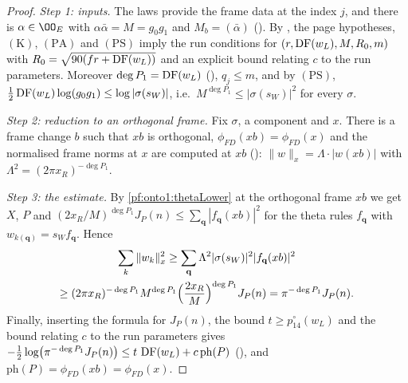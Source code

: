 \begin{proof}
\emph{Step 1: inputs.} The laws provide the frame data at the index $j$, and there is $\alpha\in\OO_E$ with $\alpha\bar\alpha=M=g_0g_1$ and
$M_b=(\bar\alpha)$ (). By
, the page hypotheses, $(\mathrm K)$, $(\mathrm{PA})$ and $(\mathrm{PS})$
imply the run conditions for $(r,\operatorname{DF}(w_L),M,R_0,m)$ with $R_0=\sqrt{90(fr+\operatorname{DF}(w_L))}$ and an explicit bound relating $c$ to
the run parameters. Moreover $\deg P_1=\operatorname{DF}(w_L)$ (), $q_j\le m$, and by
$(\mathrm{PS})$, $\frac12\operatorname{DF}(w_L)\log(g_0g_1)\le\log|\sigma(s_W)|$, i.e.\ $M^{\deg P_1}\le|\sigma(s_W)|^2$ for every $\sigma$.

\emph{Step 2: reduction to an orthogonal frame.} Fix $\sigma$, a component and $x$. There is a frame change $b$ such that $xb$ is
orthogonal, $\phi_{FD}(xb)=\phi_{FD}(x)$ and the normalised frame norms at $x$ are computed at $xb$
(): $\|w\|_x=\Lambda\cdot|w(xb)|$ with $\Lambda^2=(2\pi x_R)^{-\deg P_1}$.

\emph{Step 3: the estimate.} By \cref{pf:onto1:thetaLower} at the orthogonal frame $xb$ we get $X$, $P$ and
$(2x_R/M)^{\deg P_1}J_P(n)\le\sum_{\mathbf q}|f_{\mathbf q}(xb)|^2$ for the theta rules $f_{\mathbf q}$ with $w_{k(\mathbf q)}=s_Wf_{\mathbf q}$. Hence
\begin{multline*}
\sum_k\|w_k\|_x^2\ge\sum_{\mathbf q}\Lambda^2|\sigma(s_W)|^2|f_{\mathbf q}(xb)|^2\\
\ge(2\pi x_R)^{-\deg P_1}M^{\deg P_1}\Bigl(\frac{2x_R}M\Bigr)^{\deg P_1}J_P(n)=\pi^{-\deg P_1}J_P(n).
\end{multline*}
Finally, inserting the formula for $J_P(n)$, the bound $t\ge p^\circ_{14}(w_L)$ and the bound relating $c$ to the run parameters
gives $-\frac12\log\bigl(\pi^{-\deg P_1}J_P(n)\bigr)\le t\,\operatorname{DF}(w_L)+c\,\mathrm{ph}(P)$ (), and
$\mathrm{ph}(P)=\phi_{FD}(xb)=\phi_{FD}(x)$.
\end{proof}
